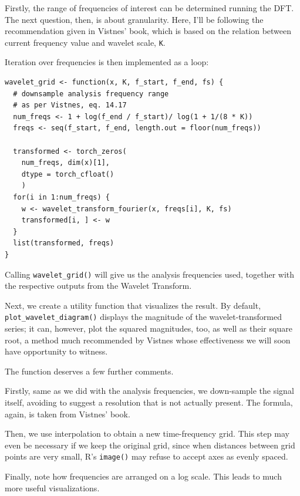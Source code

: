 \documentclass[
  letterpaper,
]{krantz}
\begin{document}
Firstly, the range of frequencies of interest can be determined running
the DFT. The next question, then, is about granularity. Here, I'll be
following the recommendation given in Vistnes' book, which is based on
the relation between current frequency value and wavelet scale,
\texttt{K}.

Iteration over frequencies is then implemented as a loop:

\begin{verbatim}
wavelet_grid <- function(x, K, f_start, f_end, fs) {
  # downsample analysis frequency range
  # as per Vistnes, eq. 14.17
  num_freqs <- 1 + log(f_end / f_start)/ log(1 + 1/(8 * K))
  freqs <- seq(f_start, f_end, length.out = floor(num_freqs))
  
  transformed <- torch_zeros(
    num_freqs, dim(x)[1],
    dtype = torch_cfloat()
    )
  for(i in 1:num_freqs) {
    w <- wavelet_transform_fourier(x, freqs[i], K, fs)
    transformed[i, ] <- w
  }
  list(transformed, freqs)
}
\end{verbatim}

Calling \texttt{wavelet\_grid()} will give us the analysis frequencies
used, together with the respective outputs from the Wavelet Transform.

Next, we create a utility function that visualizes the result. By
default, \texttt{plot\_wavelet\_diagram()} displays the magnitude of the
wavelet-transformed series; it can, however, plot the squared
magnitudes, too, as well as their square root, a method much recommended
by Vistnes whose effectiveness we will soon have opportunity to witness.

The function deserves a few further comments.

Firstly, same as we did with the analysis frequencies, we down-sample
the signal itself, avoiding to suggest a resolution that is not actually
present. The formula, again, is taken from Vistnes' book.

Then, we use interpolation to obtain a new time-frequency grid. This
step may even be necessary if we keep the original grid, since when
distances between grid points are very small, R's \texttt{image()} may
refuse to accept axes as evenly spaced.

Finally, note how frequencies are arranged on a log scale. This leads to
much more useful visualizations.
\end{document}
